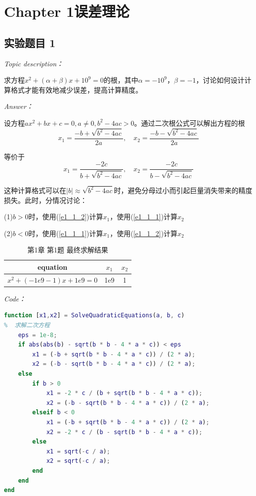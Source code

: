 \documentclass[12pt]{ctexart}
\begin{document}
\newpage
	\section{Chapter 1\quad 误差理论}
	\label{sec:1}
	
	\subsection{实验题目 1}
	\textit{Topic description：}
	
	求方程$x^2+(\alpha+\beta)x+10^9=0$的根，其中$\alpha=-10^9$，$\beta=-1$，讨论如何设计计算格式才能有效地减少误差，提高计算精度。
	
	\textit{Answer：}
	
	设方程$ax^2+bx+c=0,a\neq0,b^2-4ac>0$。通过二次根公式可以解出方程的根
	\begin{equation}
	x_1=\frac{-b+\sqrt{b^2-4ac}}{2a},\quad x_2=\frac{-b-\sqrt{b^2-4ac}}{2a}\label{e1_1_1}
	\end{equation}
	
	等价于
	\begin{equation}
	x_1=\frac{-2c}{b+\sqrt{b^2-4ac}},\quad x_2=\frac{-2c}{b-\sqrt{b^2-4ac}}\label{e1_1_2}
	\end{equation}
	
	这种计算格式可以在$|b|\approx\sqrt{b^2-4ac}$时，避免分母过小而引起巨量消失带来的精度损失。此时，分情况讨论：
	
	(1)$b>0$时，使用(\ref{e1_1_2})计算$x_1$，使用(\ref{e1_1_1})计算$x_2$
	
	(2)$b<0$时，使用(\ref{e1_1_1})计算$x_1$，使用(\ref{e1_1_2})计算$x_2$
	
	\begin{table}[htbp]
		\centering
		\caption{第1章 第1题 最终求解结果}
		\begin{tabular}
			{c|c|c}
			\hline
			equation&$x_1$&$x_2$ \\
			\hline
			$x^2+(-1e9-1)x+1e9=0$&1e9&1 \\
			\hline
		\end{tabular}
	\end{table}

	\textit{Code：}
	
	\begin{lstlisting}[language=MATLAB]
function [x1,x2] = SolveQuadraticEquations(a, b, c)
%  求解二次方程
	eps = 1e-8;
	if abs(abs(b) - sqrt(b * b - 4 * a * c)) < eps
		x1 = (-b + sqrt(b * b - 4 * a * c)) / (2 * a);
		x2 = (-b - sqrt(b * b - 4 * a * c)) / (2 * a);
	else
		if b > 0
			x1 = -2 * c / (b + sqrt(b * b - 4 * a * c));
			x2 = (-b - sqrt(b * b - 4 * a * c)) / (2 * a);
		elseif b < 0
			x1 = (-b + sqrt(b * b - 4 * a * c)) / (2 * a);
			x2 = -2 * c / (b - sqrt(b * b - 4 * a * c));
		else
			x1 = sqrt(-c / a);
			x2 = sqrt(-c / a);
		end
	end
end
	\end{lstlisting}	
	
\end{document}
